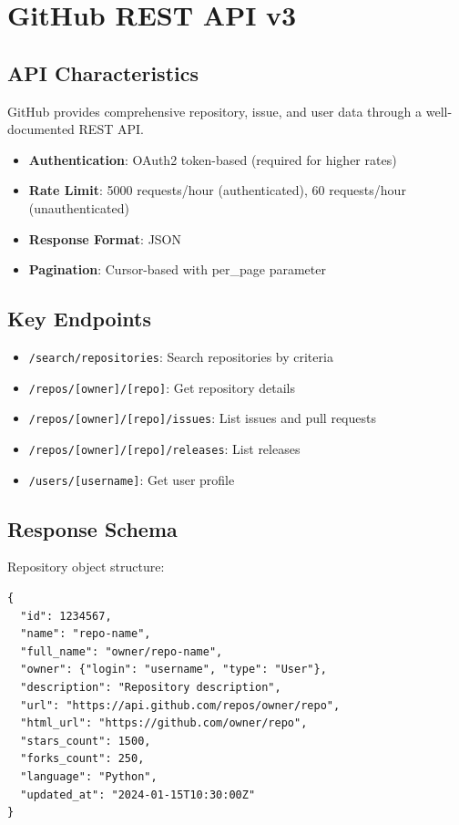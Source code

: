 \documentclass[12pt,a4paper]{report}
\begin{document}
\section{GitHub REST API v3}

\subsection{API Characteristics}

GitHub provides comprehensive repository, issue, and user data through a well-documented REST API.

\begin{itemize}
    \item \textbf{Authentication}: OAuth2 token-based (required for higher rates)
    \item \textbf{Rate Limit}: 5000 requests/hour (authenticated), 60 requests/hour (unauthenticated)
    \item \textbf{Response Format}: JSON
    \item \textbf{Pagination}: Cursor-based with per\_page parameter
\end{itemize}

\subsection{Key Endpoints}

\begin{itemize}
    \item \texttt{/search/repositories}: Search repositories by criteria
    \item \texttt{/repos/[owner]/[repo]}: Get repository details
    \item \texttt{/repos/[owner]/[repo]/issues}: List issues and pull requests
    \item \texttt{/repos/[owner]/[repo]/releases}: List releases
    \item \texttt{/users/[username]}: Get user profile
\end{itemize}

\subsection{Response Schema}

Repository object structure:

\begin{lstlisting}
{
  "id": 1234567,
  "name": "repo-name",
  "full_name": "owner/repo-name",
  "owner": {"login": "username", "type": "User"},
  "description": "Repository description",
  "url": "https://api.github.com/repos/owner/repo",
  "html_url": "https://github.com/owner/repo",
  "stars_count": 1500,
  "forks_count": 250,
  "language": "Python",
  "updated_at": "2024-01-15T10:30:00Z"
}
\end{lstlisting}
\end{document}
